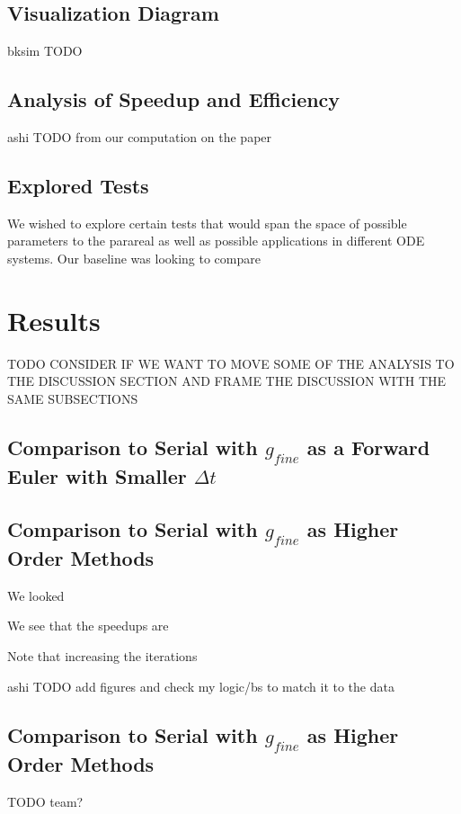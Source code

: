 \documentclass[letterpaper,twocolumn,11pt]{article}
\begin{document}
\subsection{Visualization Diagram}
bksim TODO

\subsection{Analysis of Speedup and Efficiency}

ashi TODO from our computation on the paper

\subsection{Explored Tests}

We wished to explore certain tests that would span the space of possible
parameters to the parareal as well as possible applications in different ODE
systems. Our baseline was looking to compare 

\section{Results}

TODO CONSIDER IF WE WANT TO MOVE SOME OF THE ANALYSIS TO THE DISCUSSION SECTION AND FRAME THE DISCUSSION WITH THE SAME SUBSECTIONS

\subsection{Comparison to Serial with $g_{fine}$ as a Forward Euler with
Smaller $\Delta t$}

\subsection{Comparison to Serial with $g_{fine}$ as Higher Order Methods}

We looked 

We see that the speedups are

Note that increasing the iterations

ashi TODO add figures and check my logic/bs to match it to the data

\subsection{Comparison to Serial with $g_{fine}$ as Higher Order Methods}

TODO team?
\end{document}
